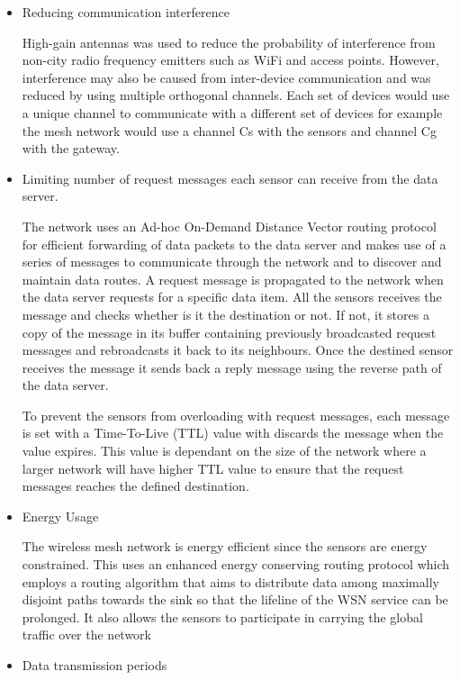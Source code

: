 \begin{itemize}
\item Reducing communication interference

High-gain antennas was used to reduce the probability of interference from non-city radio frequency emitters such as WiFi and access points. However, interference may also be caused from inter-device communication and was reduced by using multiple orthogonal channels. Each set of devices would use a unique channel to communicate with a different set of devices for example the mesh network would use a channel Cs with the sensors and channel Cg with the gateway.

\item Limiting number of request messages each sensor can receive from the data server.

The network uses an Ad-hoc On-Demand Distance Vector routing protocol for efficient forwarding of data packets to the data server and makes use of a series of messages to communicate through the network and to discover and maintain data routes. A request message is propagated to the network when the data server requests for a specific data item. All the sensors receives the message and checks whether is it the destination or not. If not, it stores a copy of the message in its buffer containing previously broadcasted request messages and rebroadcasts it back to its neighbours. Once the destined sensor receives the message it sends back a reply message using the reverse path of the data server.

To prevent the sensors from overloading with request messages, each message is set with a Time-To-Live (TTL) value with discards the message when the value expires. This value is dependant on the size of the network where a larger network will have higher TTL value to ensure that the request messages reaches the defined destination.

\item Energy Usage

The wireless mesh network is energy efficient since the sensors are energy constrained. This uses an enhanced energy conserving routing protocol which employs a routing algorithm that aims to distribute data among maximally disjoint paths towards the sink so that the lifeline of the WSN service can be prolonged. It also allows the sensors to participate in carrying the global traffic over the network

\item Data transmission periods


\end{itemize}

